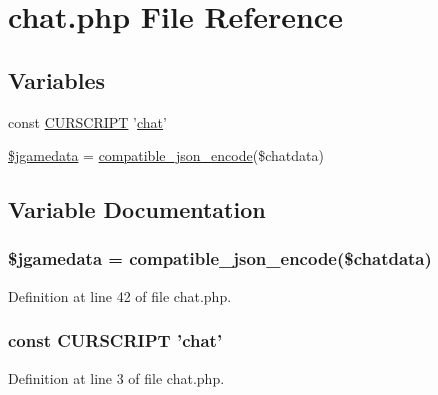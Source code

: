 \hypertarget{chat_8php}{\section{chat.\+php File Reference}
\label{chat_8php}
}
\subsection*{Variables}
\begin{DoxyCompactItemize}
\item 
const \hyperlink{chat_8php_a39c39f525eceb86cabc338804f230e80}{C\+U\+R\+S\+C\+R\+I\+P\+T} '\hyperlink{game20130526_8js_aa57ded7cb1d22494c754d847f821e5cf}{chat}'
\item 
\hyperlink{chat_8php_ad8ad32ee4a34333c6c5c5b4379a80cf2}{\$jgamedata} = \hyperlink{global_8func_8php_a90ee856f9044b751e8c137763608fba4}{compatible\+\_\+json\+\_\+encode}(\$chatdata)
\end{DoxyCompactItemize}


\subsection{Variable Documentation}
\hypertarget{chat_8php_ad8ad32ee4a34333c6c5c5b4379a80cf2}{
\subsubsection[{\$jgamedata}]{\setlength{\rightskip}{0pt plus 5cm}\$jgamedata = {\bf compatible\+\_\+json\+\_\+encode}(\$chatdata)}}\label{chat_8php_ad8ad32ee4a34333c6c5c5b4379a80cf2}


Definition at line 42 of file chat.\+php.

\hypertarget{chat_8php_a39c39f525eceb86cabc338804f230e80}{
\subsubsection[{C\+U\+R\+S\+C\+R\+I\+P\+T}]{\setlength{\rightskip}{0pt plus 5cm}const C\+U\+R\+S\+C\+R\+I\+P\+T '{\bf chat}'}}\label{chat_8php_a39c39f525eceb86cabc338804f230e80}


Definition at line 3 of file chat.\+php.

